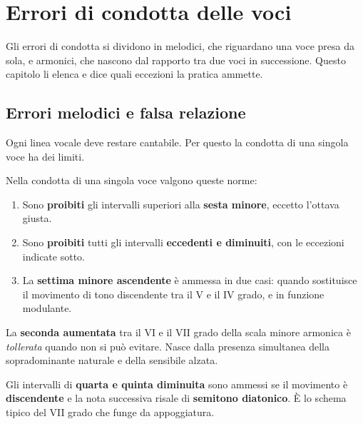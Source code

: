 \chapter{Errori di condotta delle voci}
\label{chap:errori_condotta}

Gli errori di condotta si dividono in melodici, che riguardano una voce presa da sola, e armonici, che nascono dal rapporto tra due voci in successione. Questo capitolo li elenca e dice quali eccezioni la pratica ammette.

\section{Errori melodici e falsa relazione}
\label{sec:errori_melodici}

Ogni linea vocale deve restare cantabile. Per questo la condotta di una singola voce ha dei limiti.

\begin{regola}
	\label{reg:limiti_melodici}
	Nella condotta di una singola voce valgono queste norme:
	\begin{enumerate}
		\item Sono \textbf{proibiti} gli intervalli superiori alla \textbf{sesta minore}, eccetto l'ottava giusta.
		\item Sono \textbf{proibiti} tutti gli intervalli \textbf{eccedenti e diminuiti}, con le eccezioni indicate sotto.
		\item La \textbf{settima minore ascendente} è ammessa in due casi: quando sostituisce il movimento di tono discendente tra il V e il IV grado, e in funzione modulante.
	\end{enumerate}
\end{regola}

\begin{osservazione}
	\label{oss:seconda_aumentata}
	La \textbf{seconda aumentata} tra il VI e il VII grado della scala minore armonica è \textit{tollerata} quando non si può evitare. Nasce dalla presenza simultanea della sopradominante naturale e della sensibile alzata.
\end{osservazione}

\begin{osservazione}
	\label{oss:quarta_quinta_dim}
	Gli intervalli di \textbf{quarta e quinta diminuita} sono ammessi se il movimento è \textbf{discendente} e la nota successiva risale di \textbf{semitono diatonico}. È lo schema tipico del VII grado che funge da appoggiatura.
\end{osservazione}


